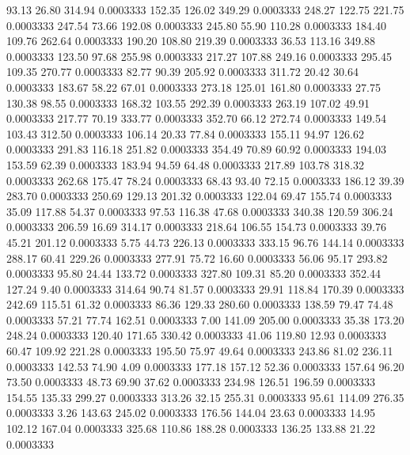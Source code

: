   93.13   26.80  314.94   0.0003333
 152.35  126.02  349.29   0.0003333
 248.27  122.75  221.75   0.0003333
 247.54   73.66  192.08   0.0003333
 245.80   55.90  110.28   0.0003333
 184.40  109.76  262.64   0.0003333
 190.20  108.80  219.39   0.0003333
  36.53  113.16  349.88   0.0003333
 123.50   97.68  255.98   0.0003333
 217.27  107.88  249.16   0.0003333
 295.45  109.35  270.77   0.0003333
  82.77   90.39  205.92   0.0003333
 311.72   20.42   30.64   0.0003333
 183.67   58.22   67.01   0.0003333
 273.18  125.01  161.80   0.0003333
  27.75  130.38   98.55   0.0003333
 168.32  103.55  292.39   0.0003333
 263.19  107.02   49.91   0.0003333
 217.77   70.19  333.77   0.0003333
 352.70   66.12  272.74   0.0003333
 149.54  103.43  312.50   0.0003333
 106.14   20.33   77.84   0.0003333
 155.11   94.97  126.62   0.0003333
 291.83  116.18  251.82   0.0003333
 354.49   70.89   60.92   0.0003333
 194.03  153.59   62.39   0.0003333
 183.94   94.59   64.48   0.0003333
 217.89  103.78  318.32   0.0003333
 262.68  175.47   78.24   0.0003333
  68.43   93.40   72.15   0.0003333
 186.12   39.39  283.70   0.0003333
 250.69  129.13  201.32   0.0003333
 122.04   69.47  155.74   0.0003333
  35.09  117.88   54.37   0.0003333
  97.53  116.38   47.68   0.0003333
 340.38  120.59  306.24   0.0003333
 206.59   16.69  314.17   0.0003333
 218.64  106.55  154.73   0.0003333
  39.76   45.21  201.12   0.0003333
   5.75   44.73  226.13   0.0003333
 333.15   96.76  144.14   0.0003333
 288.17   60.41  229.26   0.0003333
 277.91   75.72   16.60   0.0003333
  56.06   95.17  293.82   0.0003333
  95.80   24.44  133.72   0.0003333
 327.80  109.31   85.20   0.0003333
 352.44  127.24    9.40   0.0003333
 314.64   90.74   81.57   0.0003333
  29.91  118.84  170.39   0.0003333
 242.69  115.51   61.32   0.0003333
  86.36  129.33  280.60   0.0003333
 138.59   79.47   74.48   0.0003333
  57.21   77.74  162.51   0.0003333
   7.00  141.09  205.00   0.0003333
  35.38  173.20  248.24   0.0003333
 120.40  171.65  330.42   0.0003333
  41.06  119.80   12.93   0.0003333
  60.47  109.92  221.28   0.0003333
 195.50   75.97   49.64   0.0003333
 243.86   81.02  236.11   0.0003333
 142.53   74.90    4.09   0.0003333
 177.18  157.12   52.36   0.0003333
 157.64   96.20   73.50   0.0003333
  48.73   69.90   37.62   0.0003333
 234.98  126.51  196.59   0.0003333
 154.55  135.33  299.27   0.0003333
 313.26   32.15  255.31   0.0003333
  95.61  114.09  276.35   0.0003333
   3.26  143.63  245.02   0.0003333
 176.56  144.04   23.63   0.0003333
  14.95  102.12  167.04   0.0003333
 325.68  110.86  188.28   0.0003333
 136.25  133.88   21.22   0.0003333
